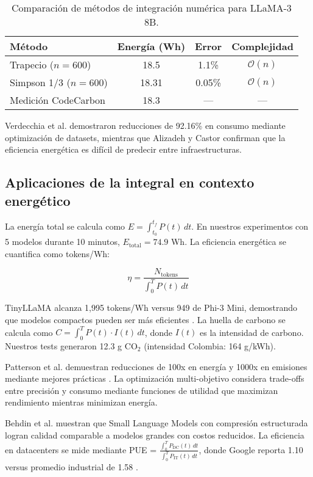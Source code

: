 \begin{table}[h]
\centering
\begin{tabular}{lccc}
\hline
\textbf{Método} & \textbf{Energía (Wh)} & \textbf{Error} & \textbf{Complejidad} \\
\hline
Trapecio ($n=600$) & 18.5 & 1.1\% & $\mathcal{O}(n)$ \\
Simpson 1/3 ($n=600$) & 18.31 & 0.05\% & $\mathcal{O}(n)$ \\
Medición CodeCarbon & 18.3 & --- & --- \\
\hline
\end{tabular}
\caption{Comparación de métodos de integración numérica para LLaMA-3 8B.}
\label{tab:comparacion_metodos}
\end{table}

Verdecchia et al. \cite{verdecchia2022datacentric} demostraron reducciones de 92.16\% en consumo mediante optimización de datasets, mientras que Alizadeh y Castor \cite{alizadeh2024green} confirman que la eficiencia energética es difícil de predecir entre infraestructuras.

\subsection{Aplicaciones de la integral en contexto energético}

La energía total se calcula como $E = \int_{t_0}^{t_f} P(t) \, dt$. En nuestros experimentos con 5 modelos durante 10 minutos, $E_{\text{total}} = 74.9$ Wh. La eficiencia energética se cuantifica como tokens/Wh:

\begin{equation}
\eta = \frac{N_{\text{tokens}}}{\int_0^T P(t) \, dt}
\end{equation}

TinyLLaMA alcanza 1,995 tokens/Wh versus 949 de Phi-3 Mini, demostrando que modelos compactos pueden ser más eficientes \cite{chatterjee2025energy}. La huella de carbono se calcula como $C = \int_0^T P(t) \cdot I(t) \, dt$, donde $I(t)$ es la intensidad de carbono. Nuestros tests generaron 12.3 g CO$_2$ (intensidad Colombia: 164 g/kWh).

Patterson et al. \cite{patterson2022carbon} demuestran reducciones de 100x en energía y 1000x en emisiones mediante mejores prácticas \cite{greensoftware2025position}. La optimización multi-objetivo considera trade-offs entre precisión y consumo mediante funciones de utilidad que maximizan rendimiento mientras minimizan energía.

Behdin et al. \cite{behdin2025scaling} muestran que Small Language Models con compresión estructurada logran calidad comparable a modelos grandes con costos reducidos. La eficiencia en datacenters se mide mediante PUE = $\frac{\int_0^T P_{\text{DC}}(t) \, dt}{\int_0^T P_{\text{IT}}(t) \, dt}$, donde Google reporta 1.10 versus promedio industrial de 1.58 \cite{google2025efficiency}.


